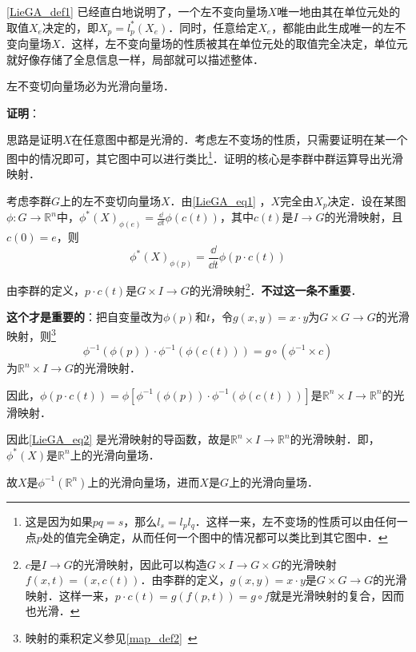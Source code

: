 \autoref{LieGA_def1} 已经直白地说明了，一个左不变向量场$X$唯一地由其在单位元处的取值$X_e$决定的，即$X_p=l_{p}^*(X_e)$．同时，任意给定$X_e$，都能由此生成唯一的左不变向量场$X$．这样，左不变向量场的性质被其在单位元处的取值完全决定，单位元就好像存储了全息信息一样，局部就可以描述整体．

\begin{theorem}{}
左不变切向量场必为光滑向量场．
\end{theorem}

\textbf{证明}：




思路是证明$X$在任意图中都是光滑的．考虑左不变场的性质，只需要证明在某一个图中的情况即可，其它图中可以进行类比\footnote{这是因为如果$pq=s$，那么$l_{s}=l_pl_q$．这样一来，左不变场的性质可以由任何一点$p$处的值完全确定，从而任何一个图中的情况都可以类比到其它图中．}．证明的核心是李群中群运算导出光滑映射．

考虑李群$G$上的左不变切向量场$X$．由\autoref{LieGA_eq1} ，$X$完全由$X_p$决定．设在某图$\phi: G\to\mathbb{R}^n$中，$\phi^*(X)_{\phi(e)}=\frac{\dd }{\dd t}\phi(c(t))$，其中$c(t)$是$I\to G$的光滑映射，且$c(0)=e$，则
\begin{equation}\label{LieGA_eq2}
\phi^*(X)_{\phi(p)}=\frac{\dd}{\dd t}\phi(p\cdot c(t))
\end{equation}

由李群的定义，$p\cdot c(t)$是$G\times I\to G$的光滑映射\footnote{$c$是$I\to G$的光滑映射，因此可以构造$G\times I\to G\times G$的光滑映射$f(x, t)=(x, c(t))$．由李群的定义，$g(x, y)=x\cdot y$是$G\times G\to G$的光滑映射．这样一来，$p\cdot c(t)=g(f(p, t))=g\circ f$就是光滑映射的复合，因而也光滑．}．\textbf{不过这一条不重要}．

\textbf{这个才是重要的}：把自变量改为$\phi(p)$和$t$，令$g(x, y)=x\cdot y$为$G\times G\to G$的光滑映射，则\footnote{映射的乘积定义参见\autoref{map_def2}~}
\begin{equation}
\phi^{-1}(\phi(p))\cdot \phi^{-1}(\phi(c(t)))=g\circ(\phi^{-1}\times c)
\end{equation}
为$\mathbb{R}^n\times I\to G$的光滑映射．

因此，$\phi(p\cdot c(t))=\phi[\phi^{-1}(\phi(p))\cdot \phi^{-1}(\phi(c(t)))]$是$\mathbb{R}^n\times I\to \mathbb{R}^n$的光滑映射．

因此\autoref{LieGA_eq2} 是光滑映射的导函数，故是$\mathbb{R}^n\times I\to \mathbb{R}^n$的光滑映射．即，$\phi^*(X)$是$\mathbb{R}^n$上的光滑向量场．

故$X$是$\phi^{-1}(\mathbb{R}^n)$上的光滑向量场，进而$X$是$G$上的光滑向量场．



